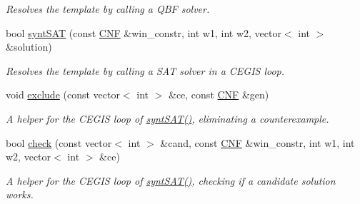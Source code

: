 \begin{DoxyCompactItemize}
\begin{DoxyCompactList}\small\item\em Resolves the template by calling a Q\-B\-F solver. \end{DoxyCompactList}\item 
bool \hyperlink{classTemplateSynth_aa0f140f63502de21ab260b5cae9335cb}{synt\-S\-A\-T} (const \hyperlink{classCNF}{C\-N\-F} \&win\-\_\-constr, int w1, int w2, vector$<$ int $>$ \&solution)
\begin{DoxyCompactList}\small\item\em Resolves the template by calling a S\-A\-T solver in a C\-E\-G\-I\-S loop. \end{DoxyCompactList}\item 
void \hyperlink{classTemplateSynth_af55609e303daffb4d51b27380d32ddb3}{exclude} (const vector$<$ int $>$ \&ce, const \hyperlink{classCNF}{C\-N\-F} \&gen)
\begin{DoxyCompactList}\small\item\em A helper for the C\-E\-G\-I\-S loop of \hyperlink{classTemplateSynth_aa0f140f63502de21ab260b5cae9335cb}{synt\-S\-A\-T()}, eliminating a counterexample. \end{DoxyCompactList}\item 
bool \hyperlink{classTemplateSynth_a3e841e4eb71a5286057afbeac42c7a47}{check} (const vector$<$ int $>$ \&cand, const \hyperlink{classCNF}{C\-N\-F} \&win\-\_\-constr, int w1, int w2, vector$<$ int $>$ \&ce)
\begin{DoxyCompactList}\small\item\em A helper for the C\-E\-G\-I\-S loop of \hyperlink{classTemplateSynth_aa0f140f63502de21ab260b5cae9335cb}{synt\-S\-A\-T()}, checking if a candidate solution works. \end{DoxyCompactList}\end{DoxyCompactItemize}
